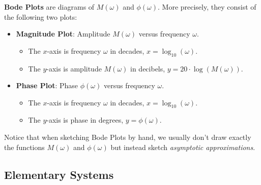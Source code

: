 \documentclass[ 10pt, xcolor = dvipsnames]{beamer}
\begin{document}
\begin{frame}[allowframebreaks]
\frametitle{\insertsection}

\textbf{Bode Plots} are diagrams of $M(\omega)$ and $\phi(\omega)$. More precisely, they consist of \linebreak the following two plots: 
\begin{itemize}
\item \textbf{Magnitude Plot}: Amplitude $M(\omega)$ versus frequency $\omega$. 
\begin{itemize}
\item The $x$-axis is frequency $\omega$ in decades, \ie $x = \log_{10}(\omega)$. 
\item The $y$-axis is amplitude $M(\omega)$ in decibels, \ie $y = 20 \cdot \log(M(\omega))$. 
\end{itemize}
\item \textbf{Phase Plot}: Phase $\phi(\omega)$ versus frequency $\omega$. 
\begin{itemize}
\item The $x$-axis is frequency $\omega$ in decades, \ie $x = \log_{10}(\omega)$. 
\item The $y$-axis is phase in degrees, \ie $y = \phi(\omega)$. 
\end{itemize}
\end{itemize}
\halfskip

Notice that when sketching Bode Plots by hand, we usually don't draw exactly \linebreak the functions $M(\omega)$ and $\phi(\omega)$ but instead sketch \emph{asymptotic approximations}. 

\end{frame}

\subsection{Elementary Systems}
\end{document}
